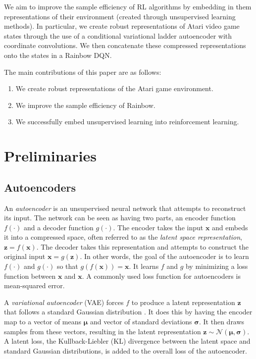 \documentclass{article}
\begin{document}
We aim to improve the sample efficiency of RL algorithms by embedding in them representations of their environment (created  through unsupervised learning methods).
In particular, we create robust representations of Atari video game states through the use of a conditional variational ladder autoencoder with coordinate convolutions.
We then concatenate these compressed representations onto the states in a Rainbow DQN.

The main contributions of this paper are as follows:

\begin{enumerate}
    \item We create robust representations of the Atari game environment. 
    \item We improve the sample efficiency of Rainbow.
    \item We successfully embed unsupervised learning into reinforcement learning.
\end{enumerate}

\section{Preliminaries}

\subsection{Autoencoders}

An \emph{autoencoder} is an unsupervised neural network that attempts to reconstruct its input. 
The network can be seen as having two parts, an encoder function $f(\cdot)$ and a decoder function $g(\cdot)$.
The encoder takes the input $\textbf{x}$ and embeds it into a compressed space, often referred to as the \emph{latent space representation}, $\textbf{z}=f(\textbf{x})$.
The decoder takes this representation and attempts to construct the original input $\textbf{\~x}=g(\textbf{z})$.
In other words, the goal of the autoencoder is to learn $f(\cdot)$ and $g(\cdot)$ so that
$g(f(\textbf{x}))=\textbf{x}$.
It learns $f$ and $g$ by minimizing a loss function between $\textbf{x}$ and $\textbf{\~x}$.
A commonly used loss function for autoencoders is mean-squared error.

A \emph{variational autoencoder} (VAE) forces $f$ to produce a latent representation $\textbf{z}$ that follows a standard Gaussian distribution \cite{kingma:auto-encoding}.
It does this by having the encoder map to a vector of means $\pmb{\mu}$ and vector of standard deviations $\pmb{\sigma}$.
It then draws samples from these vectors, resulting in the latent representation
$\textbf{z} \sim \mathcal{N}(\pmb{\mu}, \pmb{\sigma})$.
A latent loss, the Kullback-Liebler (KL) divergence between the latent space and standard Gaussian distributions, is added to the overall loss of the autoencoder.
\end{document}
